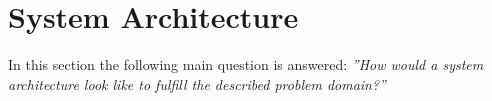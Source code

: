 \section{System Architecture}
In this section the following main question is answered: \textit{''How would a system architecture look like to fulfill the described problem domain?''}